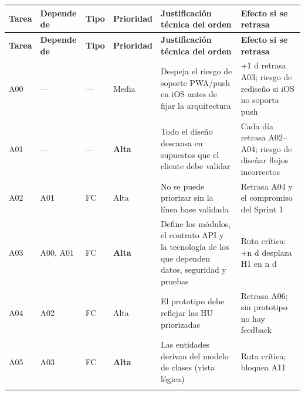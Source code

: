 \documentclass[11pt,a4paper]{article}
\begin{document}
\begingroup\footnotesize
\begin{longtable}{@{}>{\raggedright\arraybackslash\hspace{0pt}}p{}>{\raggedright\arraybackslash\hspace{0pt}}p{}>{\raggedright\arraybackslash\hspace{0pt}}p{}>{\raggedright\arraybackslash\hspace{0pt}}p{}>{\raggedright\arraybackslash\hspace{0pt}}p{}>{\raggedright\arraybackslash\hspace{0pt}}p{}@{}}
\toprule
\textbf{Tarea} & \textbf{Depende de} & \textbf{Tipo} & \textbf{Prioridad} & \textbf{Justificación técnica del orden} & \textbf{Efecto si se retrasa} \\ \midrule
\endfirsthead
\toprule
\textbf{Tarea} & \textbf{Depende de} & \textbf{Tipo} & \textbf{Prioridad} & \textbf{Justificación técnica del orden} & \textbf{Efecto si se retrasa} \\ \midrule
\endhead
\bottomrule
\endlastfoot
\mbox{A00} & --- & --- & \mbox{Media} & Despeja el riesgo de soporte PWA/push en iOS antes de fijar la arquitectura & +1 d retrasa A03; riesgo de rediseño si iOS no soporta push \\ \addlinespace[0.25em]
\mbox{A01} & --- & --- & \textbf{Alta} & Todo el diseño descansa en supuestos que el cliente debe validar & Cada día retrasa A02--A04; riesgo de diseñar flujos incorrectos \\ \addlinespace[0.25em]
\mbox{A02} & \mbox{A01} & \mbox{FC} & \mbox{Alta} & No se puede priorizar sin la línea base validada & Retrasa A04 y el compromiso del Sprint 1 \\ \addlinespace[0.25em]
\mbox{A03} & A00, A01 & \mbox{FC} & \textbf{Alta} & Define los módulos, el contrato API y la tecnología de los que dependen datos, seguridad y pruebas & Ruta crítica: +n d desplaza H1 en n d \\ \addlinespace[0.25em]
\mbox{A04} & \mbox{A02} & \mbox{FC} & \mbox{Alta} & El prototipo debe reflejar las HU priorizadas & Retrasa A06; sin prototipo no hay feedback \\ \addlinespace[0.25em]
\mbox{A05} & \mbox{A03} & \mbox{FC} & \textbf{Alta} & Las entidades derivan del modelo de clases (vista lógica) & Ruta crítica; bloquea A11 \\ \addlinespace[0.25em]

\end{longtable}
\end{document}
